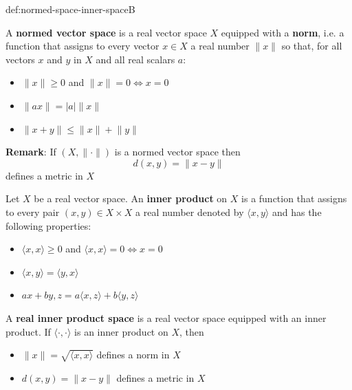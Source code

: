 \documentclass[landscape, 8pt]{extarticle}
\begin{document}
\begin{multicols}{3}
\vspace{-5pt}
\begin{dfn}{def:normed-space-inner-space}{B}
    \vspace{-5pt}

    \vspace{-3pt}
    A \textbf{normed vector space} is a real vector space $X$ equipped with a \textbf{norm}, i.e. a function that assigns to every vector $x\in X$ a real number $\lVert x \rVert$ so that, for all vectors $x$ and $y$ in $X$ and all real scalars $a$:

    \vspace{-5pt}
    \begin{itemize}
        \item $\lVert x\rVert\ge 0 $ and $\lVert x \rVert = 0 \iff x = 0$
        \item $\lVert ax \rVert = \lvert a \rvert\lVert x \rVert$
        \item $\lVert x+y \rVert\le \lVert x \rVert + \lVert y \rVert$
    \end{itemize}

    \vspace{-7pt}
    \longrule{0.08ex}
    \textbf{Remark}: If $(X, \lVert \cdot \rVert)$ is a normed vector space then
    \[d(x,y) = \lVert x - y \rVert\]
    defines a metric in $X$




    Let $X$ be a real vector space. An \textbf{inner product} on $X$ is a function that assigns to every pair $(x,y)\in X \times X $ a real number denoted by $\langle x,y \rangle$ and has the following properties:
    \vspace{-3pt}
    \begin{itemize}
        \item $\langle x,x \rangle\ge 0$ and $\langle x,x \rangle = 0 \iff x = 0$
        \item $\langle x,y \rangle = \langle y,x \rangle$
        \item $ax + by, z = a\langle x,z \rangle + b\langle y,z \rangle$
    \end{itemize}

    \vspace{-5pt}
    \longrule{0.08ex}
    A \textbf{real inner product space} is a real vector space equipped with an inner product.
    If $\langle \cdot, \cdot \rangle$ is an inner product on $X$, then
    \vspace{-5pt}
    \begin{itemize}
        \item $\lVert x \rVert = \sqrt{\langle x,x \rangle}$ defines a norm in $X$
        \item $d(x,y) = \lVert x - y \rVert$ defines a metric in $X$
    \end{itemize}
    \vspace{-5pt}
\end{dfn}



\end{multicols}
\end{document}
